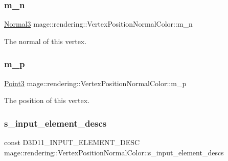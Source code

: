 \subsubsection{\texorpdfstring{m\+\_\+n}{m\_n}}
{\footnotesize\ttfamily \hyperlink{structmage_1_1_normal3}{Normal3} mage\+::rendering\+::\+Vertex\+Position\+Normal\+Color\+::m\+\_\+n}

The normal of this vertex. \hypertarget{structmage_1_1rendering_1_1_vertex_position_normal_color_ad89961e1a0b0bd97f580a34709e4e05f}{}\label{structmage_1_1rendering_1_1_vertex_position_normal_color_ad89961e1a0b0bd97f580a34709e4e05f} 
\subsubsection{\texorpdfstring{m\+\_\+p}{m\_p}}
{\footnotesize\ttfamily \hyperlink{structmage_1_1_point3}{Point3} mage\+::rendering\+::\+Vertex\+Position\+Normal\+Color\+::m\+\_\+p}

The position of this vertex. \hypertarget{structmage_1_1rendering_1_1_vertex_position_normal_color_adadf05a78d26b87baef8a9c3cb80ae54}{}\label{structmage_1_1rendering_1_1_vertex_position_normal_color_adadf05a78d26b87baef8a9c3cb80ae54} 
\subsubsection{\texorpdfstring{s\+\_\+input\+\_\+element\+\_\+descs}{s\_input\_element\_descs}}
{\footnotesize\ttfamily const D3\+D11\+\_\+\+I\+N\+P\+U\+T\+\_\+\+E\+L\+E\+M\+E\+N\+T\+\_\+\+D\+E\+SC mage\+::rendering\+::\+Vertex\+Position\+Normal\+Color\+::s\+\_\+input\+\_\+element\+\_\+descs\hspace{0.3cm}{\ttfamily [static]}}

